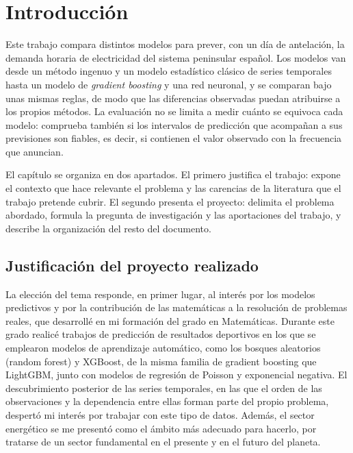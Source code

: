 
\chapter{Introducción}\label{cap:introduccion}

Este trabajo compara distintos modelos para prever, con un día de antelación,
la demanda horaria de electricidad del sistema peninsular español. Los modelos
van desde un método ingenuo y un modelo estadístico clásico de series
temporales hasta un modelo de \textit{gradient boosting} y una red neuronal, y
se comparan bajo unas mismas reglas, de modo que las diferencias observadas
puedan atribuirse a los propios métodos. La evaluación no se limita a medir
cuánto se equivoca cada modelo: comprueba también si los intervalos de
predicción que acompañan a sus previsiones son fiables, es decir, si contienen
el valor observado con la frecuencia que anuncian.

El capítulo se organiza en dos apartados. El primero justifica el trabajo:
expone el contexto que hace relevante el problema y las carencias de la
literatura que el trabajo pretende cubrir. El segundo presenta el proyecto:
delimita el problema abordado, formula la pregunta de investigación y las
aportaciones del trabajo, y describe la organización del resto del documento.

\section{Justificación del proyecto realizado}\label{sec:justificacion}

La elección del tema responde, en primer lugar, al interés por los modelos predictivos y por la contribución de las matemáticas a la resolución de problemas reales, que desarrollé en mi formación del grado en Matemáticas. Durante este grado realicé trabajos de predicción de resultados deportivos en los que se emplearon modelos de aprendizaje automático, como los bosques aleatorios (random forest) y XGBoost, de la misma familia de gradient boosting que LightGBM, junto con modelos de regresión de Poisson y exponencial negativa. El descubrimiento posterior de las series temporales, en las que el orden de las observaciones y la dependencia entre ellas forman parte del propio problema, despertó mi interés por trabajar con este tipo de datos. Además, el sector energético se me presentó como el ámbito más adecuado para hacerlo, por tratarse de un sector fundamental en el presente y en el futuro del planeta.

